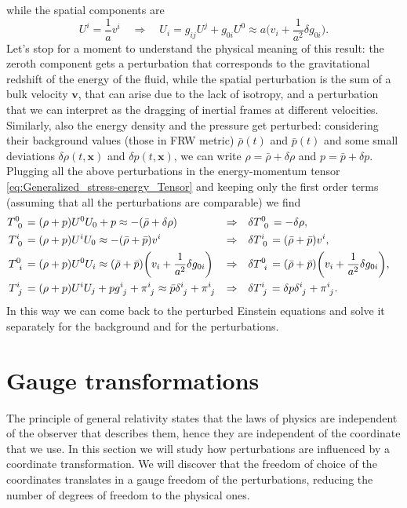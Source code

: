 while the spatial components are
$$U^i=\frac{1}{a}v^i\quad \Rightarrow\quad U_i=g_{ij}U^j+g_{0i}U^0\approx a\bigg(v_i+\frac{1}{a^2}\delta g_{0i}\bigg).$$
Let's stop for a moment to understand the physical meaning of this result: the zeroth component gets a perturbation that corresponds to the gravitational redshift of the energy of the fluid, while the spatial perturbation is the sum of a bulk velocity $\mathbf v$, that can arise due to the lack of isotropy, and a perturbation that we can interpret as the dragging of inertial frames at different velocities.\\
Similarly, also the energy density and the pressure get perturbed: considering their background values (those in FRW metric) $\bar\rho(t)$ and $\bar p(t)$ and some small deviations $\delta\rho(t,\mathbf x)$ and $\delta p(t,\mathbf x)$, we can write $\rho=\bar\rho+\delta\rho$ and $p=\bar p+\delta p$.\\ Plugging all the above perturbations in the energy-momentum tensor \eqref{eq:Generalized_stress-energy_Tensor} and keeping only the first order terms (assuming that all the perturbations are comparable) we find
\begin{align}
    \tensor{T}{^0_0}&=(\rho+p)U^0U_0+p\approx-(\bar\rho+\delta\rho)&\Rightarrow\quad &\delta \tensor{T}{^0_0}=-\delta\rho,\label{eq:perturbed_T00}&&\\
     \tensor{T}{^i_0}&=(\rho+p)U^iU_0\approx -(\bar\rho+\bar p)v^i&\Rightarrow\quad &\delta \tensor{T}{^i_0}=(\bar\rho+\bar p)v^i,\label{eq:perturbed_Ti0}&&\\
    \tensor{T}{^0_i}&=(\rho+p)U^0U_i\approx (\bar\rho+\bar p)\bigg(v_i+\frac{1}{a^2}\delta g_{0i}\bigg)&\Rightarrow\quad &\delta \tensor{T}{^0_i}=(\bar\rho+\bar p)\bigg(v_i+\frac{1}{a^2}\delta g_{0i}\bigg),\label{eq:perturbed_T0i}&&\\
    \tensor{T}{^i_j}&=(\rho+p)U^iU_j+p\tensor{g}{^i_j}+\tensor{\pi}{^i_j}\approx \bar p\tensor{\delta}{^i_j}+\tensor{\pi}{^i_j}  &\Rightarrow\quad &\delta \tensor{T}{^i_j}=\delta p\tensor{\delta}{^i_j}+\tensor{\pi}{^i_j}.\label{eq:perturbed_Tij}&&
\end{align} 
In this way we can come back to the perturbed Einstein equations and solve it separately for the background and for the perturbations.
\section{Gauge transformations}
The principle of general relativity states that the laws of physics are independent of the observer that describes them, hence they are independent of the coordinate that we use. In this section we will study how perturbations are influenced by a coordinate transformation. We will discover that the freedom of choice of the coordinates translates in a gauge freedom of the perturbations, reducing the number of degrees of freedom to the physical ones.

